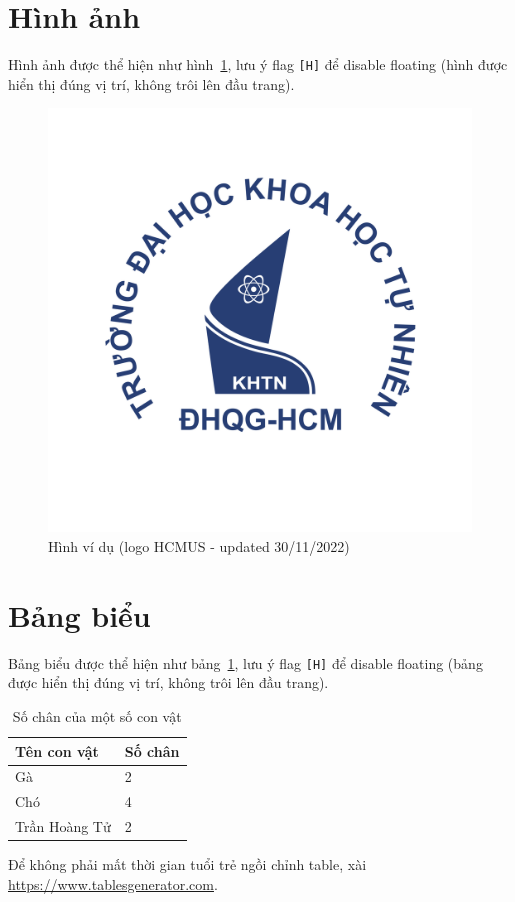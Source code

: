 \section{Hình ảnh}
Hình ảnh được thể hiện như hình~\ref{fig:my_label}, lưu ý flag \texttt{[H]} để disable floating (hình được hiển thị đúng vị trí, không trôi lên đầu trang).
\begin{figure}%
    \centering
    \includegraphics[scale=.4]{img/hcmus-logo.png}
    \caption{Hình ví dụ (logo HCMUS - updated 30/11/2022)}
    \label{fig:my_label}
\end{figure}

\section{Bảng biểu}
Bảng biểu được thể hiện như bảng~\ref{tab:my_label}, lưu ý flag \texttt{[H]} để disable floating (bảng được hiển thị đúng vị trí, không trôi lên đầu trang).
\begin{table}%
\centering
\begin{tabular}{|l|l|}
\hline
\textbf{Tên con vật} & \textbf{Số chân} \\ \hline
Gà & 2 \\ \hline
Chó & 4 \\ \hline
Trần Hoàng Tử & 2 \\ \hline
\end{tabular}
\caption{Số chân của một số con vật}
\label{tab:my_label}
\end{table}
Để không phải mất thời gian tuổi trẻ ngồi chỉnh table, xài \href{https://www.tablesgenerator.com}{https://www.tablesgenerator.com}.